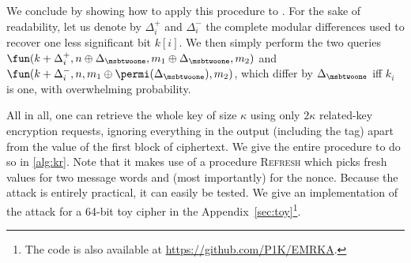 
We conclude by showing how to apply this procedure to \proestotr. For the sake of readability, let us denote
by $\Delta_i^+$ and $\Delta_i^-$ the complete modular differences used to recover one less significant bit $k[i]$.
We then simply perform the two queries $\fun(k + \Delta_i^+, n \oplus \Delta_{\msbtwoone}, m_1 \oplus \Delta_{\msbtwoone}, m_2)$
and $\fun(k + \Delta_i^-, n, m_1 \oplus \permi(\Delta_{\msbtwoone}), m_2)$, which differ by $\Delta_{\msbtwoone}$ iff $k_i$ is one,
with overwhelming probability.

All in all, one can retrieve the whole key of size
$\kappa$ using only $2\kappa$ related-key encryption requests, ignoring
everything in the output (including the tag) apart from the value of the first block
of ciphertext. We give the entire procedure to do so in \autoref{alg:kr}. Note that it makes use
of a procedure \textsc{Refresh} which picks fresh values for two message words and (most importantly)
for the nonce. Because
the attack is entirely practical, it can easily be tested. We give an implementation of the attack
for a 64-bit toy cipher in the Appendix~\ref{sec:toy}\footnote{The code is also available at \url{https://github.com/P1K/EMRKA}.}.

